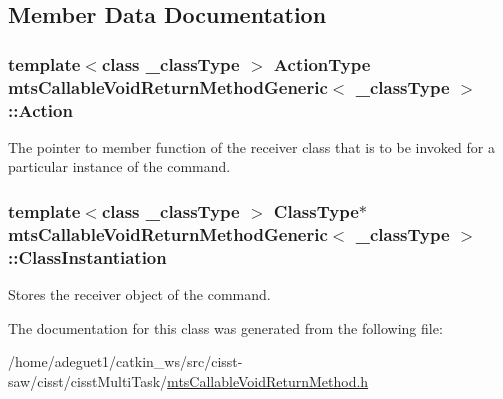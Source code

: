 \subsection{Member Data Documentation}
\hypertarget{classmts_callable_void_return_method_generic_a3d55827aaf012a7732d1956ef5ff583e}{
\subsubsection[{Action}]{\setlength{\rightskip}{0pt plus 5cm}template$<$class \-\_\-class\-Type $>$ {\bf Action\-Type} {\bf mts\-Callable\-Void\-Return\-Method\-Generic}$<$ \-\_\-class\-Type $>$\-::Action\hspace{0.3cm}{\ttfamily [protected]}}}\label{classmts_callable_void_return_method_generic_a3d55827aaf012a7732d1956ef5ff583e}
The pointer to member function of the receiver class that is to be invoked for a particular instance of the command. \hypertarget{classmts_callable_void_return_method_generic_a15414bc65b1c9d9b97b8cfcbc7c3b2d8}{
\subsubsection[{Class\-Instantiation}]{\setlength{\rightskip}{0pt plus 5cm}template$<$class \-\_\-class\-Type $>$ {\bf Class\-Type}$\ast$ {\bf mts\-Callable\-Void\-Return\-Method\-Generic}$<$ \-\_\-class\-Type $>$\-::Class\-Instantiation\hspace{0.3cm}{\ttfamily [protected]}}}\label{classmts_callable_void_return_method_generic_a15414bc65b1c9d9b97b8cfcbc7c3b2d8}
Stores the receiver object of the command. 

The documentation for this class was generated from the following file\-:\begin{DoxyCompactItemize}
\item 
/home/adeguet1/catkin\-\_\-ws/src/cisst-\/saw/cisst/cisst\-Multi\-Task/\hyperlink{mts_callable_void_return_method_8h}{mts\-Callable\-Void\-Return\-Method.\-h}\end{DoxyCompactItemize}
